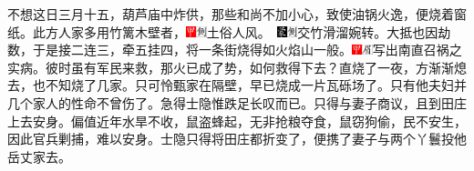 不想这日三月十五，葫芦庙中炸供，那些和尚不加小心，致使油锅火逸，便烧着窗纸。此方人家多用竹篱木壁者，{{\includegraphics[width=3mm]{../Images/00002}\includegraphics[width=3mm]{../Images/00011}\footnotesize 土俗人风。　}\includegraphics[width=3mm]{../Images/00006}\includegraphics[width=3mm]{../Images/00011}\footnotesize 交竹滑溜婉转。}大抵也因劫数，于是接二连三，牵五挂四，将一条街烧得如火焰山一般。{\includegraphics[width=3mm]{../Images/00002}\includegraphics[width=3mm]{../Images/00010}\footnotesize  写出南直召祸之实病。}彼时虽有军民来救，那火已成了势，如何救得下去？直烧了一夜，方渐渐熄去，也不知烧了几家。只可怜甄家在隔壁，早已烧成一片瓦砾场了。只有他夫妇并几个家人的性命不曾伤了。急得士隐惟跌足长叹而已。只得与妻子商议，且到田庄上去安身。偏值近年水旱不收，鼠盗蜂起，无非抢粮夺食，鼠窃狗偷，民不安生，因此官兵剿捕，难以安身。士隐只得将田庄都折变了，便携了妻子与两个丫鬟投他岳丈家去。


